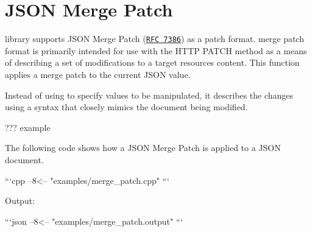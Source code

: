 \chapter{JSON Merge Patch }
\hypertarget{md_include_2nlohman_2json-develop_2docs_2mkdocs_2docs_2features_2merge__patch}{}\label{md_include_2nlohman_2json-develop_2docs_2mkdocs_2docs_2features_2merge__patch}
\label{md_include_2nlohman_2json-develop_2docs_2mkdocs_2docs_2features_2merge__patch_autotoc_md1480}%
%


 library supports JSON Merge Patch (\href{https://tools.ietf.org/html/rfc7386}{\texttt{RFC 7386}}) as a patch format.  merge patch format is primarily intended for use with the HTTP PATCH method as a means of describing a set of modifications to a target resource\textquotesingle{}s content. This function applies a merge patch to the current JSON value.

Instead of using  to specify values to be manipulated, it describes the changes using a syntax that closely mimics the document being modified.

??? example \begin{DoxyVerb}The following code shows how a JSON Merge Patch is applied to a JSON document.

```cpp
--8<-- "examples/merge_patch.cpp"
```

Output:

```json
--8<-- "examples/merge_patch.output"
```
\end{DoxyVerb}
 